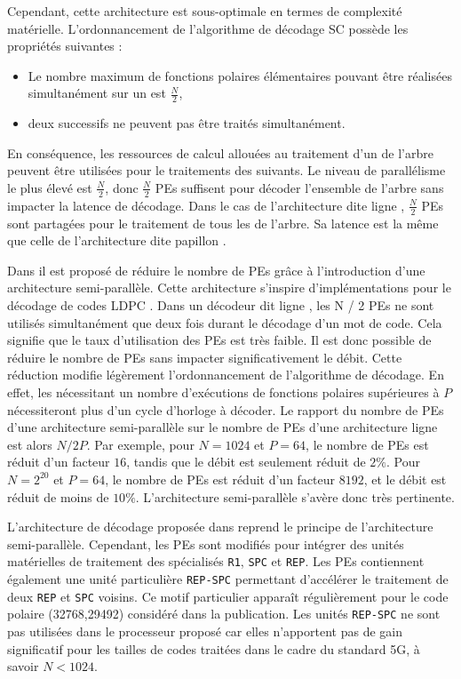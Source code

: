 Cependant, cette architecture est sous-optimale en termes de complexité matérielle.
L'ordonnancement de l'algorithme de décodage SC possède les propriétés suivantes :
\begin{itemize}
  \item Le nombre maximum de fonctions polaires élémentaires pouvant être réalisées simultanément sur un \noeud est $\frac{N}{2}$,
  \item deux \noeuds successifs ne peuvent pas être traités simultanément.
\end{itemize}
En conséquence, les ressources de calcul allouées au traitement d'un \noeud de l'arbre peuvent être utilisées pour le traitements des \noeuds suivants.
Le niveau de parallélisme le plus élevé est $\frac{N}{2}$, donc $\frac{N}{2}$ PEs suffisent pour décoder l'ensemble de l'arbre sans impacter la latence de décodage.
Dans le cas de l'architecture dite \og ligne \fg, $\frac{N}{2}$ PEs sont partagées pour le traitement de tous les \noeuds de l'arbre. Sa latence est la même que celle de l'architecture dite \og papillon \fg.

Dans \cite{leroux_semi-parallel_2013} il est proposé de réduire le nombre de PEs grâce à l'introduction d'une architecture semi-parallèle. Cette architecture s'inspire d'implémentations pour le décodage de codes LDPC \cite{1049697}. Dans un décodeur dit \og ligne \fg, les N / 2 PEs ne sont utilisés simultanément que deux fois durant le décodage d'un mot de code. Cela signifie que le taux d'utilisation des PEs est très faible. Il est donc possible de réduire le nombre de PEs sans impacter significativement le débit.
Cette réduction modifie légèrement l'ordonnancement de l'algorithme de décodage. En effet, les \noeuds nécessitant un nombre d'exécutions de fonctions polaires supérieures à $P$ nécessiteront plus d'un cycle d'horloge à décoder. Le rapport du nombre de PEs d'une architecture semi-parallèle sur le nombre de PEs d'une architecture \og ligne \fg est alors $N/2P$. Par exemple, pour $N=1024$ et $P=64$, le nombre de PEs est réduit d'un facteur $16$, tandis que le débit est seulement réduit de $2\%$. Pour $N=2^{20}$ et $P=64$, le nombre de PEs est réduit d'un facteur $8192$, et le débit est réduit de moins de $10\%$. L'architecture semi-parallèle s'avère donc très pertinente.

L'architecture de décodage proposée dans \cite{sarkis_fast_2014} reprend le principe de l'architecture semi-parallèle. Cependant, les PEs sont modifiés pour intégrer des unités matérielles de traitement des \noeuds spécialisés \texttt{R1}, \texttt{SPC} et \texttt{REP}. Les PEs contiennent également une unité particulière \texttt{REP-SPC} permettant d’accélérer le traitement de deux \noeuds \texttt{REP} et \texttt{SPC} voisins. Ce motif particulier apparaît régulièrement pour le code polaire (32768,29492) considéré dans la publication. Les unités \texttt{REP-SPC} ne sont pas utilisées dans le processeur proposé car elles n'apportent pas de gain significatif pour les tailles de codes traitées dans le cadre du standard 5G, à savoir $N<1024$.

